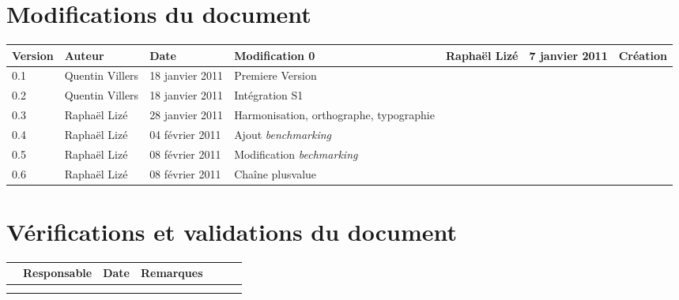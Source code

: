 
\section*{Modifications du document}

\begin{center}
\begin{longtable}{|m{14mm}|m{36mm}|m{36mm}|m{60mm}|}
\hline
Version & Auteur & Date & Modification\endhead \hline
0
& %
Raphaël Lizé
& %
7 janvier 2011
& %
Création
\\\hline
0.1
& %
Quentin Villers
& %
18 janvier 2011
& %
Premiere Version
\\\hline
0.2
& %
Quentin Villers
& %
18 janvier 2011
& %
Intégration S1
\\\hline
0.3
& %
Raphaël Lizé
& %
28 janvier 2011
& %
Harmonisation, orthographe, typographie
\\\hline
0.4
& %
Raphaël Lizé
& %
04 février 2011
& %
Ajout {\sl benchmarking}
\\\hline
0.5
& %
Raphaël Lizé
& %
08 février 2011
& %
Modification {\sl bechmarking}
\\\hline
0.6
& %
Raphaël Lizé
& %
08 février 2011
& %
Chaîne plusvalue
\\\hline
\end{longtable}
\end{center}


\section*{Vérifications et validations du document}

\begin{center}
\begin{longtable}{|m{15mm}|m{36mm}|m{36mm}|m{60mm}|}
\hline
 & Responsable & Date & Remarques\endhead \hline
& %
& %
& %
\\\hline

& %

& %

& %

\\\hline

& %

& %

& %

\\\hline
\end{longtable}
\end{center}

\pagebreak
